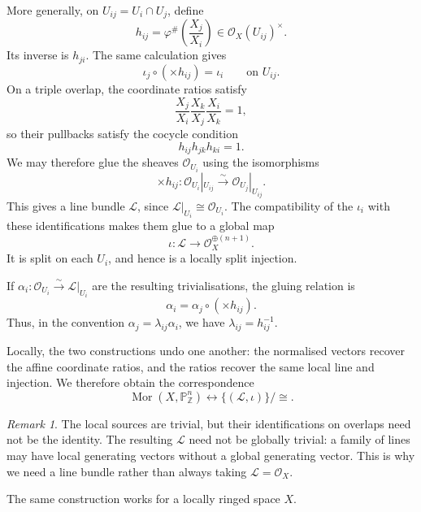 \documentclass{article}
\theoremstyle{definition}
\theoremstyle{remark}
\newtheorem{remark}{Remark}[section]
\theoremstyle{plain}
\newcommand{\Z}{\mathbb{Z}}
\renewcommand{\P}{\mathbb{P}}
\begin{document}
More generally, on \(U_{ij}=U_i\cap U_j\), define
\[
    h_{ij}
    =
    \varphi^\#\left(\frac{X_j}{X_i}\right)
    \in\mathcal O_X(U_{ij})^\times.
\]
Its inverse is \(h_{ji}\). The same calculation gives
\[
    \iota_j\circ(\times h_{ij})=\iota_i
    \qquad\text{on }U_{ij}.
\]
On a triple overlap, the coordinate ratios satisfy
\[
    \frac{X_j}{X_i}
    \frac{X_k}{X_j}
    \frac{X_i}{X_k}=1,
\]
so their pullbacks satisfy the cocycle condition
\[
    h_{ij}h_{jk}h_{ki}=1.
\]
We may therefore glue the sheaves \(\mathcal O_{U_i}\)
using the isomorphisms
\[
    \times h_{ij}:
    \mathcal O_{U_i}|_{U_{ij}}
    \xrightarrow{\sim}
    \mathcal O_{U_j}|_{U_{ij}}.
\]
This gives a line bundle \(\mathcal L\), since
\(\mathcal L|_{U_i}\cong\mathcal O_{U_i}\).
The compatibility of the \(\iota_i\) with these
identifications makes them glue to a global map
\[
    \iota:\mathcal L\longrightarrow
    \mathcal O_X^{\oplus(n+1)}.
\]
It is split on each \(U_i\), and hence is a locally split
injection.

If
\(\alpha_i:\mathcal O_{U_i}\xrightarrow{\sim}\mathcal L|_{U_i}\)
are the resulting trivialisations, the gluing relation is
\[
    \alpha_i=\alpha_j\circ(\times h_{ij}).
\]
Thus, in the convention \(\alpha_j=\lambda_{ij}\alpha_i\),
we have \(\lambda_{ij}=h_{ij}^{-1}\).

Locally, the two constructions undo one another: the
normalised vectors recover the affine coordinate ratios,
and the ratios recover the same local line and injection.
We therefore obtain the correspondence
\[
    \operatorname{Mor}(X,\P^n_\Z)
    \longleftrightarrow
    \{(\mathcal L,\iota)\}/\cong.
\]

\begin{remark}
    The local sources are trivial, but their identifications
    on overlaps need not be the identity. The resulting
    \(\mathcal L\) need not be globally trivial: a family of
    lines may have local generating vectors without a global
    generating vector. This is why we need a line bundle
    rather than always taking \(\mathcal L=\mathcal O_X\).

    The same construction works for a locally ringed space
    \(X\).
\end{remark}
\end{document}
